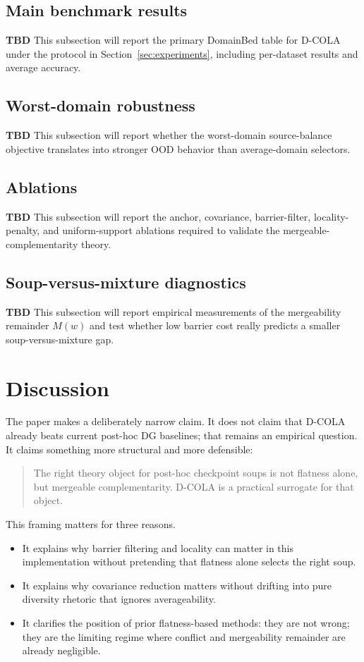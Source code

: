 \documentclass{article}
\theoremstyle{definition}
\newcommand{\TBD}{\textbf{TBD}}
\newcommand{\dcola}{\textup{\textsc{D-COLA}}}
\begin{document}
\subsection{Main benchmark results}
\TBD{} This subsection will report the primary DomainBed table for \dcola{} under the protocol in Section~\ref{sec:experiments}, including per-dataset results and average accuracy.

\subsection{Worst-domain robustness}
\TBD{} This subsection will report whether the worst-domain source-balance objective translates into stronger OOD behavior than average-domain selectors.

\subsection{Ablations}
\TBD{} This subsection will report the anchor, covariance, barrier-filter, locality-penalty, and uniform-support ablations required to validate the mergeable-complementarity theory.

\subsection{Soup-versus-mixture diagnostics}
\TBD{} This subsection will report empirical measurements of the mergeability remainder \(M(w)\) and test whether low barrier cost really predicts a smaller soup-versus-mixture gap.

\section{Discussion}

The paper makes a deliberately narrow claim. It does not claim that \dcola{} already beats current post-hoc DG baselines; that remains an empirical question. It claims something more structural and more defensible:
\begin{quote}
The right theory object for post-hoc checkpoint soups is not flatness alone, but mergeable complementarity. \dcola{} is a practical surrogate for that object.
\end{quote}

This framing matters for three reasons.
\begin{itemize}[leftmargin=1.3em]
    \item It explains why barrier filtering and locality can matter in this implementation without pretending that flatness alone selects the right soup.
    \item It explains why covariance reduction matters without drifting into pure diversity rhetoric that ignores averageability.
    \item It clarifies the position of prior flatness-based methods: they are not wrong; they are the limiting regime where conflict and mergeability remainder are already negligible.
\end{itemize}
\end{document}

